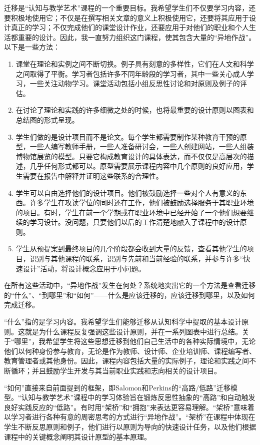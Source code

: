 迁移是“认知与教学艺术”课程的一个重要目标。我希望学生们不仅要学习内容，还要积极地使用它；不仅是在撰写相关文章的意义上积极使用它，还要将其应用于设计真正的学习；不仅完成他们的课堂设计作业，还要应用于对他们的职业和个人生活都重要的设计。因此，我一直努力组织这门课程，使其包含大量的“异地作战”。以下是一些方法：
\begin{enumerate}
    \item 课堂在理论和实例之间不断切换。例子具有刻意的多样性，它们在人文和科学之间取得了平衡。学习者包括许多不同年龄段的学习者，其中一些关心成人学习，一些关注动物学习。课堂活动包括小组反思性讨论和对原则及例子的评估。
    \item 在讨论了理论和实践的许多细微之处的时候，也将最重要的设计原则以图表和总结图的形式呈现。
    \item 学生们做的是设计项目而不是论文。每个学生都需要制作某种教育干预的原型，一些人编写教师手册，一些人准备研讨会，一些人创建网站，一些人组装博物馆展览的模型。只要它构成教育设计的具体表达，而不仅仅是高层次的描述，几乎任何形式都可以。原型需要展示课程内容中几个原则的良好应用，学生需要在报告中解释并证明这些联系的合理性。
    \item 学生可以自由选择他们的设计项目。他们被鼓励选择一些对个人有意义的东西。许多学生在攻读学位的同时还在工作，他们被鼓励选择服务于其职业环境的项目。有时，学生在前一个学期或在职业环境中已经开始了一个他们想要继续的学习设计。没问题，只要他们以后的工作清楚地融入了课程中的设计原则。
    \item 学生从预提案到最终项目的几个阶段都会收到大量的反馈，查看其他学生的项目，识别与其他课程的联系，识别与先前和当前经验的联系，并参与许多“快速设计”活动，将设计概念应用于小问题。
\end{enumerate}

在所有这些活动中，“异地作战”发生在何处？系统地突出它的一个方法是查看迁移的“什么”、“到哪里”和“如何”——什么是应该迁移的，应该迁移到哪里，以及如何完成迁移。

“什么”指的是学习内容。我希望学生们能够迁移从认知科学中提取的基本设计原则。这就是为什么课程反复强调这些设计原则，并在一系列图表中进行总结。关于“哪里”，我希望学生将这些思想迁移到他们自己生活中的各种实际情境中，无论他们以何种身份参与教育，无论是作为教师、设计师、企业培训师、课程编写者、教育管理者或其他身份。因此，课程内容包括大量的实际例子，理论和实践之间不断循环；并且鼓励学生开发与其当前职业实践和志向相关的设计项目。

“如何”直接来自前面提到的框架，即Salomon和Perkins的“高路/低路”迁移模型。“认知与教学艺术”课程中的学习体验旨在锻炼反思性抽象的“高路”和自动触发良好实践反应的“低路”。有时用“架桥”和“拥抱”来表达更容易理解。“架桥”意味着以学习者进行各种有意的周密思考的方式进行“异地作战”。“架桥”在课程中体现在学生不断反思原则和例子，他们进行以原则为导向的快速设计任务，以及他们根据课程中的关键概念阐明其设计原型的基本原理。

